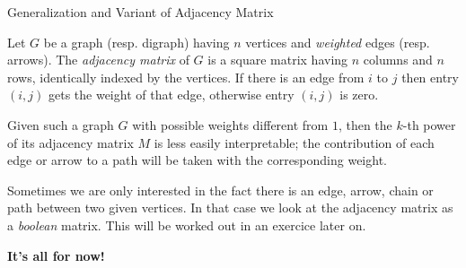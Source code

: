 \documentclass[32pt,aspectratio=169]{beamer}
\begin{document}
\begin{frame}{Generalization and Variant of Adjacency Matrix}
  \begin{defn}
    Let $G$ be a graph (resp. digraph) having $n$ vertices and
    \emph{weighted} edges (resp. arrows). The \emph{adjacency matrix}
    of $G$ is a square matrix having $n$ columns and $n$ rows,
    identically indexed by the vertices. If there is an edge from $i$
    to $j$ then entry $(i, j)$ gets the weight of that edge, otherwise
    entry $(i, j)$ is zero.
  \end{defn}
  \pause Given such a graph $G$ with possible weights different from
  $1$, then the $k$-th power of its adjacency matrix $M$ is less
  easily interpretable; the contribution of each edge or arrow to a
  path will be taken with the corresponding weight. \pause

  \vspace{\baselineskip}

  Sometimes we are only interested in the fact there is an edge,
  arrow, chain or path between two given vertices. In that case we
  look at the adjacency matrix as a \emph{boolean} matrix. This will
  be worked out in an exercice later on.
\end{frame}

\begin{frame}
  \begin{center}
    {\Large \textbf{It's all for now!}}
   \end{center}
 \end{frame}


\end{document}
